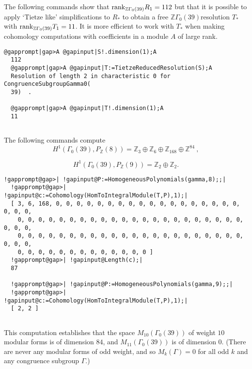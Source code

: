 \documentclass[a4paper,11pt]{report}
\begin{document}
{{The following commands show that ${\rm rank}_{\mathbb Z\Gamma_0(39)} R_1 = 112$ but that it is possible to apply `Tietze like' simplifications to $R_\ast$ to obtain a free $\mathbb Z\Gamma_0(39)$\texttt{}resolution $T_\ast$ with ${\rm rank}_{\mathbb Z\Gamma_0(39)} T_1 = 11$. It is more efficient to work with $T_\ast$ when making cohomology computations with coefficients in a module $A$ of large rank. 
\begin{Verbatim}[commandchars=@|A,fontsize=\small,frame=single,label=Example]
  @gapprompt|gap>A @gapinput|S!.dimension(1);A
  112
  @gapprompt|gap>A @gapinput|T:=TietzeReducedResolution(S);A
  Resolution of length 2 in characteristic 0 for CongruenceSubgroupGamma0(
  39)  . 
  
  @gapprompt|gap>A @gapinput|T!.dimension(1);A
  11
  
\end{Verbatim}
 

The following commands compute 
\[H^1(\Gamma_0(39),P_{\mathbb Z}(8)) = \mathbb Z_3 \oplus \mathbb Z_6 \oplus
\mathbb Z_{168} \oplus \mathbb Z^{84}\ ,\]
 
\[H^1(\Gamma_0(39),P_{\mathbb Z}(9)) = \mathbb Z_2 \oplus \mathbb Z_2 .\]
 
\begin{Verbatim}[commandchars=!@|,fontsize=\small,frame=single,label=Example]
  !gapprompt@gap>| !gapinput@P:=HomogeneousPolynomials(gamma,8);;|
  !gapprompt@gap>| !gapinput@c:=Cohomology(HomToIntegralModule(T,P),1);|
  [ 3, 6, 168, 0, 0, 0, 0, 0, 0, 0, 0, 0, 0, 0, 0, 0, 0, 0, 0, 0, 0, 0, 0, 0, 
    0, 0, 0, 0, 0, 0, 0, 0, 0, 0, 0, 0, 0, 0, 0, 0, 0, 0, 0, 0, 0, 0, 0, 0, 0, 
    0, 0, 0, 0, 0, 0, 0, 0, 0, 0, 0, 0, 0, 0, 0, 0, 0, 0, 0, 0, 0, 0, 0, 0, 0, 
    0, 0, 0, 0, 0, 0, 0, 0, 0, 0, 0, 0, 0 ]
  !gapprompt@gap>| !gapinput@Length(c);|
  87
  
  !gapprompt@gap>| !gapinput@P:=HomogeneousPolynomials(gamma,9);;|
  !gapprompt@gap>| !gapinput@c:=Cohomology(HomToIntegralModule(T,P),1);|
  [ 2, 2 ]
  
\end{Verbatim}
 

This computation establishes that the space $M_{10}(\Gamma_0(39))$ of weight $10$ modular forms is of dimension $84$, and $M_{11}(\Gamma_0(39))$ is of dimension $0$. (There are never any modular forms of odd weight, and so $M_k(\Gamma)=0$ for all odd $k$ and any congruence subgroup $\Gamma$.) 
}}
\end{document}
